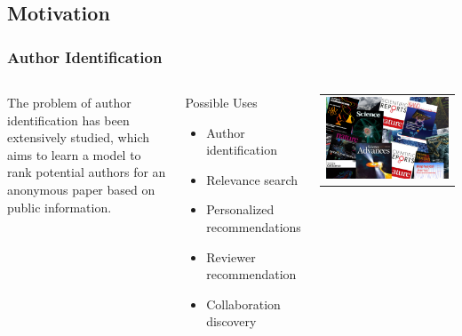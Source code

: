 \subsection{Motivation}

\begin{frame}
\frametitle{Author Identification}

\begin{columns}

The problem of author identification has been extensively studied, which aims to learn a model to rank potential authors for an anonymous paper based on public information.


\pause
\begin{block}{Possible Uses}
    \begin{itemize}
        \item Author identification
        \item Relevance search
        \item Personalized recommendations
        \item Reviewer recommendation
        \item Collaboration discovery
    \end{itemize}
\end{block}

\begin{center}
\begin{tabular}{c}
\includegraphics[width=\textwidth]{img/journals}
\end{tabular}
\end{center}
\end{columns}
\end{frame}
